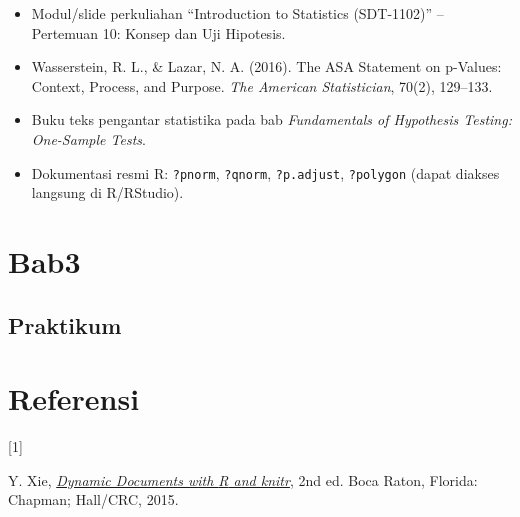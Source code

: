 \documentclass[
  indonesian,
  letterpaper,
]{book}
\newlength{\cslhangindent}
\newlength{\csllabelwidth}
\newenvironment{CSLReferences}[2] %
 {\begin{list}{}{%
  \setlength{\itemindent}{0pt}
  \setlength{\leftmargin}{0pt}
  \setlength{\parsep}{0pt}
  \ifodd #1
   \setlength{\leftmargin}{\cslhangindent}
   \setlength{\itemindent}{-1\cslhangindent}
  \fi
  \setlength{\itemsep}{#2\baselineskip}}}
 {\end{list}}
\newcommand{\CSLLeftMargin}[1]{\parbox[t]{\csllabelwidth}{\strut#1\strut}}
\newcommand{\CSLRightInline}[1]{\parbox[t]{\linewidth - \csllabelwidth}{\strut#1\strut}}
\providecommand{\tightlist}{%
  \setlength{\itemsep}{0pt}\setlength{\parskip}{0pt}}
\begin{document}
\begin{itemize}
\tightlist
\item
  Modul/slide perkuliahan ``Introduction to Statistics (SDT-1102)'' --
  Pertemuan 10: Konsep dan Uji Hipotesis.
\item
  Wasserstein, R. L., \& Lazar, N. A. (2016). The ASA Statement on
  p-Values: Context, Process, and Purpose. \emph{The American
  Statistician}, 70(2), 129--133.
\item
  Buku teks pengantar statistika pada bab \emph{Fundamentals of
  Hypothesis Testing: One-Sample Tests}.
\item
  Dokumentasi resmi R: \texttt{?pnorm}, \texttt{?qnorm},
  \texttt{?p.adjust}, \texttt{?polygon} (dapat diakses langsung di
  R/RStudio).
\end{itemize}


\chapter{Bab3}\label{bab3}

\section{Praktikum}\label{praktikum}


\chapter*{Referensi}\label{referensi}


\protect{}\label{refs}
\begin{CSLReferences}{0}{0}
\CSLLeftMargin{{[}1{]} }%
\CSLRightInline{Y. Xie, \emph{\href{http://yihui.name/knitr/}{Dynamic
Documents with {R} and knitr}}, 2nd ed. Boca Raton, Florida: Chapman;
Hall/CRC, 2015.}

\end{CSLReferences}


\backmatter
\end{document}
